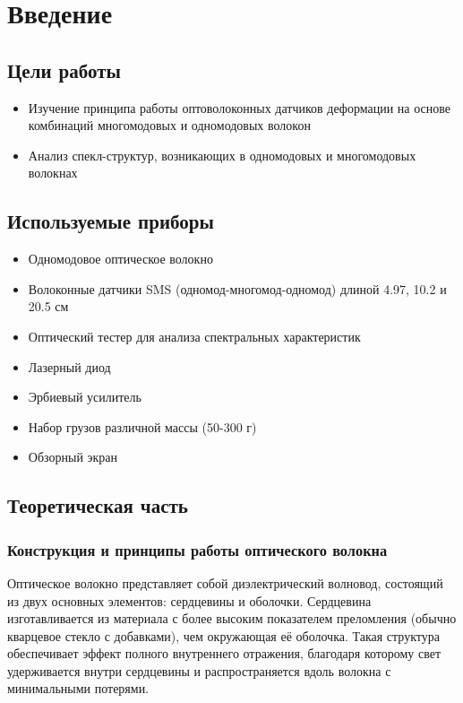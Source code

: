 \section{Введение}
\subsection{Цели работы} 
\begin{itemize}
    \item Изучение принципа работы оптоволоконных датчиков деформации на основе комбинаций многомодовых и одномодовых волокон
    \item Анализ спекл-структур, возникающих в одномодовых и многомодовых волокнах
\end{itemize}

\subsection{Используемые приборы}
\begin{itemize}
    \item Одномодовое оптическое волокно
    \item Волоконные датчики SMS (одномод-многомод-одномод) длиной 4.97, 10.2 и 20.5 см
    \item Оптический тестер для анализа спектральных характеристик
    \item Лазерный диод
    \item Эрбиевый усилитель
    \item Набор грузов различной массы (50-300 г)
    \item Обзорный экран
\end{itemize}

\subsection{Теоретическая часть}

\subsubsection{Конструкция и принципы работы оптического волокна}
Оптическое волокно представляет собой диэлектрический волновод, состоящий из двух основных элементов: сердцевины и оболочки. Сердцевина изготавливается из материала с более высоким показателем преломления (обычно кварцевое стекло с добавками), чем окружающая её оболочка. Такая структура обеспечивает эффект полного внутреннего отражения, благодаря которому свет удерживается внутри сердцевины и распространяется вдоль волокна с минимальными потерями.

